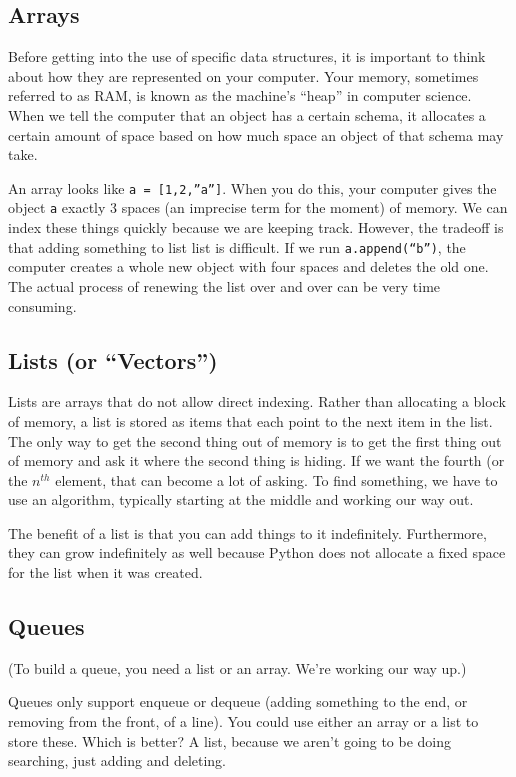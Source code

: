 \documentclass[12pt,letter]{article}
\begin{document}
\subsection{Arrays}
Before getting into the use of specific data structures, it is
important to think about how they are represented on your
computer. Your memory, sometimes referred to as RAM, is known as the
machine's ``heap'' in computer science. When we tell the computer that
an object has a certain schema, it allocates a certain amount of space
based on how much space an object of that schema may take. 

An array looks like \texttt{a = [1,2,''a'']}. When you do this, your
computer gives the object \texttt{a} exactly 3 spaces (an imprecise
term for the moment) of memory. We can index these things quickly
because we are keeping track. However, the tradeoff is that adding
something to list list is difficult. If we run
\texttt{a.append(``b'')}, the computer creates a whole new object with
four spaces and deletes the old one. The actual process of renewing
the list over and over can be very time consuming. 

\subsection{Lists (or ``Vectors'')}
Lists are arrays that do not allow direct indexing. Rather than
allocating a block of memory, a list is stored as items that each
point to the next item in the list. The only way to get the second
thing out of memory is to get the first thing out of memory and ask it
where the second thing is hiding. If we want the fourth (or the
$n^{th}$ element, that can become a lot of asking. To find something,
we have to use an algorithm, typically starting at the middle and
working our way out. 

The benefit of a list is that you can add things to it
indefinitely. Furthermore, they can grow indefinitely as well because
Python does not allocate a fixed space for the list when it was
created. 

\subsection{Queues}
(To build a queue, you need a list or an array. We're working our way
up.)

Queues only support enqueue or dequeue (adding something to the end,
or removing from the front, of a line). You could use either an array
or a list to store these. Which is better? A list, because we aren't
going to be doing searching, just adding and deleting. 
\end{document}
